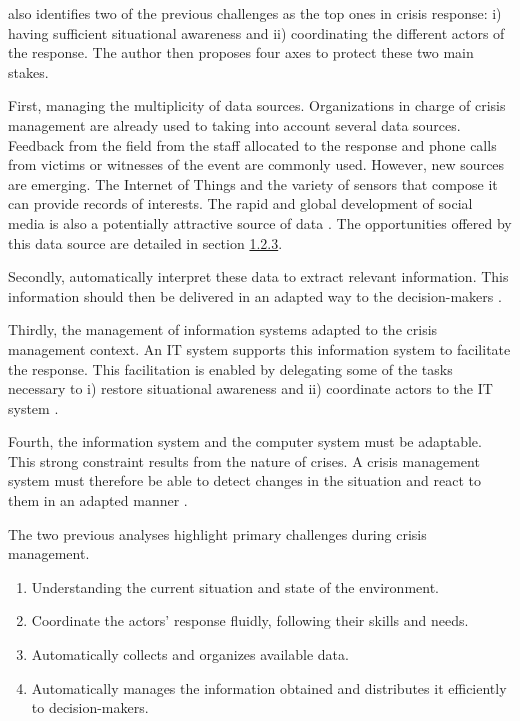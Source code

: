 \textcite{batardIntegrerContributionsCitoyennes2021} also identifies two of the previous challenges as the top ones in crisis response: i) having sufficient situational awareness and ii) coordinating the different actors of the response.
The author then proposes four axes to protect these two main stakes.

First, managing the multiplicity of data sources.
Organizations in charge of crisis management are already used to taking into account several data sources.
Feedback from the field from the staff allocated to the response and phone calls from victims or witnesses of the event are commonly used.
However, new sources are emerging.
The Internet of Things and the variety of sensors that compose it can provide records of interests.
The rapid and global development of social media is also a potentially attractive source of data \parencite{meierStrengtheningHumanitarianInformation2013}.
The opportunities offered by this data source are detailed in section \hyperref[sec:nlp]{1.2.3}.

Secondly, automatically interpret these data to extract relevant information.
This information should then be delivered in an adapted way to the decision-makers \parencite{luokkalaDevelopingInformationSystems2014,vandewalleImprovingSituationAwareness2016}.

Thirdly, the management of information systems adapted to the crisis management context.
An IT system supports this information system to facilitate the response.
This facilitation is enabled by delegating some of the tasks necessary to i) restore situational awareness and ii) coordinate actors to the IT system \parencite{benabenManagementCollaborativeBehavior2015}.

Fourth, the information system and the computer system must be adaptable.
This strong constraint results from the nature of crises.
A crisis management system must therefore be able to detect changes in the situation and react to them in an adapted manner \parencite{barthe-delanoeEventdrivenAgilityInteroperability2014,charlesModelDefineAssess2010}.

The two previous analyses highlight primary challenges during crisis management.

\begin{enumerate}
    \item Understanding the current situation and state of the environment.
    \item Coordinate the actors' response fluidly, following their skills and needs.
    \item Automatically collects and organizes available data.
    \item Automatically manages the information obtained and distributes it efficiently to decision-makers.
\end{enumerate}

